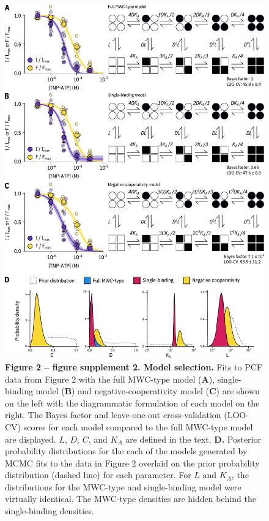 \documentclass[9pt,lineno, onehalfspacing]{elife_modified}
\begin{document}
\begin{figure}
\begin{fullwidth}
\includegraphics[height=0.89\textheight]{figure_two_s2}
\captionsetup{labelformat=empty}
\caption{
\textbf{Figure 2 -- figure supplement 2. Model selection.}
Fits to PCF data from Figure 2 with the full MWC-type model (\textbf{A}), single-binding model (\textbf{B}) and negative-cooperativity model (\textbf{C}) are shown on the left with the diagrammatic formulation of each model on the right.
The Bayes factor and leave-one-out cross-validation (LOO-CV) scores for each model compared to the full MWC-type model are displayed.
$L$, $D$, $C$, and $K_A$ are defined in the text.
\textbf{D.}
Posterior probability distributions for the each of the models generated by MCMC fits to the data in Figure 2 overlaid on the prior probability distribution (dashed line) for each parameter.
For $L$ and $K_A$, the distributions for the MWC-type and single-binding model were virtually identical.
The MWC-type densities are hidden behind the single-binding densities.
}
\label{fig:two_s2}
\end{fullwidth}
\end{figure}
\end{document}

